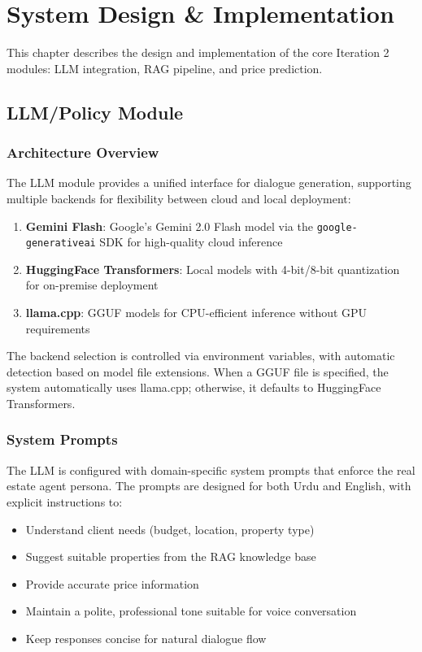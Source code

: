 \chapter{System Design \& Implementation}
\label{ch:design-implementation}
This chapter describes the design and implementation of the core Iteration 2 modules: LLM integration, RAG pipeline, and price prediction.
\section{LLM/Policy Module}

\subsection{Architecture Overview}

The LLM module provides a unified interface for dialogue generation, supporting multiple backends for flexibility between cloud and local deployment:

\begin{enumerate}
    \item \textbf{Gemini Flash}: Google's Gemini 2.0 Flash model via the \texttt{google-generativeai} SDK for high-quality cloud inference
    \item \textbf{HuggingFace Transformers}: Local models with 4-bit/8-bit quantization for on-premise deployment
    \item \textbf{llama.cpp}: GGUF models for CPU-efficient inference without GPU requirements
\end{enumerate}

The backend selection is controlled via environment variables, with automatic detection based on model file extensions. When a GGUF file is specified, the system automatically uses llama.cpp; otherwise, it defaults to HuggingFace Transformers.

\subsection{System Prompts}

The LLM is configured with domain-specific system prompts that enforce the real estate agent persona. The prompts are designed for both Urdu and English, with explicit instructions to:

\begin{itemize}
    \item Understand client needs (budget, location, property type)
    \item Suggest suitable properties from the RAG knowledge base
    \item Provide accurate price information
    \item Maintain a polite, professional tone suitable for voice conversation
    \item Keep responses concise for natural dialogue flow
\end{itemize}

